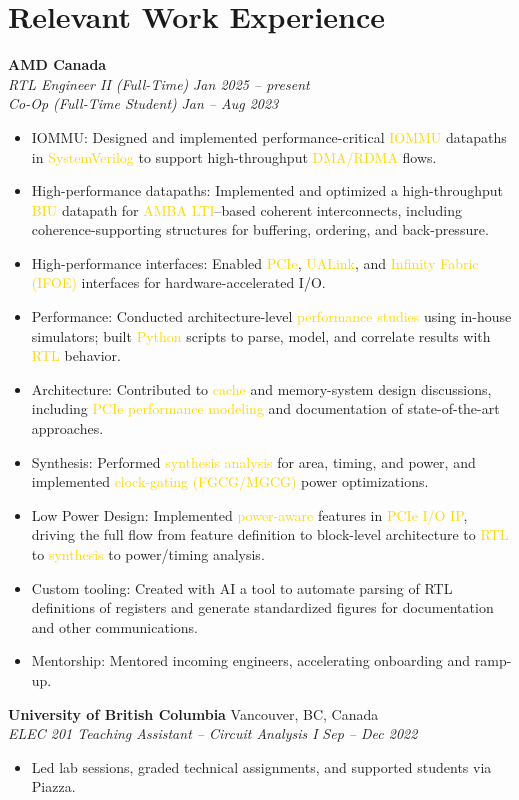 \documentclass[11pt]{article}
\newcommand{\gold}[1]{\textcolor{gold}{#1}}
\newcommand{\resumeItem}[1]{\item\small{#1}}
\newcommand{\resumeSubheading}[4]{%
  \textbf{#1} \hfill #2\\
  \textit{#3} \hfill \textit{#4}\\
}
\begin{document}
\section{Relevant Work Experience}
\textbf{AMD Canada}\\
\textit{RTL Engineer II (Full-Time)} \hfill \textit{Jan 2025 -- present}\\
\textit{Co-Op (Full-Time Student)} \hfill \textit{Jan -- Aug 2023}
\begin{itemize}[leftmargin=*]
  \resumeItem{IOMMU: Designed and implemented performance-critical \gold{IOMMU} datapaths in \gold{SystemVerilog} to support high-throughput \gold{DMA/RDMA} flows.}
  \resumeItem{High-performance datapaths: Implemented and optimized a high-throughput \gold{BIU} datapath for \gold{AMBA LTI}--based coherent interconnects, including coherence-supporting structures for buffering, ordering, and back-pressure.}
  \resumeItem{High-performance interfaces: Enabled \gold{PCIe}, \gold{UALink}, and \gold{Infinity Fabric (IFOE)} interfaces for hardware-accelerated I/O.}
  \resumeItem{Performance: Conducted architecture-level \gold{performance studies} using in-house simulators; built \gold{Python} scripts to parse, model, and correlate results with \gold{RTL} behavior.}
  \resumeItem{Architecture: Contributed to \gold{cache} and memory-system design discussions, including \gold{PCIe performance modeling} and documentation of state-of-the-art approaches.}
  \resumeItem{Synthesis: Performed \gold{synthesis analysis} for area, timing, and power, and implemented \gold{clock-gating (FGCG/MGCG)} power optimizations.}
  \resumeItem{Low Power Design: Implemented \gold{power-aware} features in \gold{PCIe I/O IP}, driving the full flow from feature definition to block-level architecture to \gold{RTL} to \gold{synthesis} to power/timing analysis.}
  \resumeItem{Custom tooling: Created with AI a tool to automate parsing of RTL definitions of registers and generate standardized figures for documentation and other communications.}
  \resumeItem{Mentorship: Mentored incoming engineers, accelerating onboarding and ramp-up.}
\end{itemize}
\vspace{4pt}
\resumeSubheading{University of British Columbia}{Vancouver, BC, Canada}{ELEC 201 Teaching Assistant -- Circuit Analysis I}{Sep -- Dec 2022}
\vspace{-10pt}
\begin{itemize}[leftmargin=*]
  \resumeItem{Led lab sessions, graded technical assignments, and supported students via Piazza.}
\end{itemize}
\end{document}
